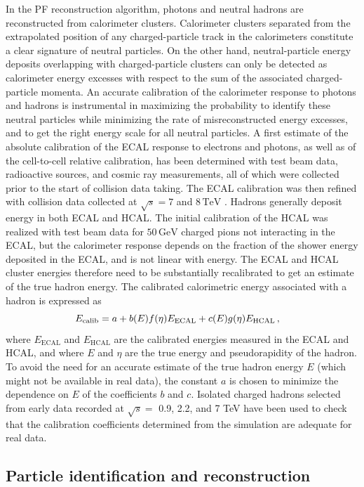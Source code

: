 In the PF reconstruction algorithm, photons and neutral hadrons are reconstructed from calorimeter clusters. Calorimeter clusters separated from the extrapolated position of any charged-particle track in the calorimeters constitute a clear signature of neutral particles.  On the other hand, neutral-particle energy deposits overlapping with charged-particle clusters can only be detected  as  calorimeter  energy  excesses  with  respect  to  the  sum  of  the  associated  charged-particle momenta. An accurate calibration of the calorimeter response to photons and hadrons is instrumental in maximizing the probability to identify these neutral particles while minimizing the rate of misreconstructed energy excesses, and to get the right energy scale for all neutral particles. A first estimate of the absolute calibration of the ECAL response to electrons and photons, as well as of the cell-to-cell relative calibration, has been determined with test beam data, radioactive sources,  and cosmic ray measurements,  all of which were collected prior to the start of collision data taking.  The ECAL calibration was then refined with collision data collected at $\sqrt{s}=7$ and $8\,\mathrm{TeV}$ \cite{2013}. Hadrons generally deposit energy in both ECAL and HCAL. The initial calibration of the HCAL was realized with test beam data for $50\,\mathrm{GeV}$ charged pions not interacting in the ECAL, but the calorimeter response depends on the fraction of the shower energy deposited in the ECAL, and is not linear with energy. The ECAL and HCAL cluster energies therefore need to be substantially recalibrated to get an estimate of the true hadron energy. The calibrated calorimetric energy associated with a hadron is expressed as
\begin{equation}
    E_{\mathrm{calib}} = a + b(E)f(\eta)E_{\mathrm{ECAL}} + c(E)g(\eta)E_{\mathrm{HCAL}} \msep
\end{equation}
where $E_{\mathrm{ECAL}}$ and $E_{\mathrm{HCAL}}$ are the calibrated energies measured in the ECAL and HCAL, and where $E$ and $\eta$ are the true energy and pseudorapidity of the hadron. To avoid the need for an accurate estimate of the true hadron energy $E$ (which might not be available in real data),  the constant $a$ is chosen to minimize the dependence on $E$ of the coefficients $b$ and $c$. Isolated charged hadrons selected from early data recorded at $\sqrt{s}=$ 0.9, 2.2, and 7 TeV have been used to check that the calibration coefficients determined from the simulation are adequate for real data.

\subsection{Particle identification and reconstruction}

